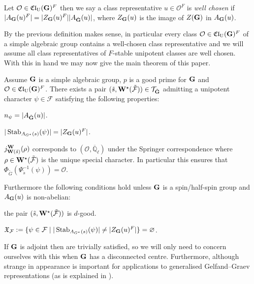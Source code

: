 \documentclass[eqthmnum]{jt-calcs}
\newcommand{\Clu}{\ensuremath{\mathfrak{Cl}_{\mathrm{U}}}}
\newcommand{\Ql}{\ensuremath{\overline{\mathbb{Q}}_{\ell}}}
\renewcommand{\cref}{\Cref}
\begin{document}
\begin{definition}
Let $\mathcal{O} \in \Clu(\bG)^F$ then we say a class representative $u \in \mathcal{O}^F$ is \emph{well chosen} if $|A_{\mathbf{G}}(u)^F| = |Z_{\mathbf{G}}(u)^F||A_{\tilde{\mathbf{G}}}(u)|$, where $Z_{\mathbf{G}}(u)$ is the image of $Z(\mathbf{G})$ in $A_{\mathbf{G}}(u)$.
\end{definition}

By \cite[Proposition 2.4]{taylor:2011:on-unipotent-supports} the previous definition makes sense, in particular every class $\mathcal{O} \in \Clu(\bG)^F$ of a simple algebraic group contains a well-chosen class representative and we will assume all class representatives of $F$-stable unipotent classes are well chosen. With this in hand we may now give the main theorem of this paper.

\begin{thm}\label{prop:A}
Assume $\mathbf{G}$ is a simple algebraic group, $p$ is a good prime for $\mathbf{G}$ and $\mathcal{O} \in \Clu(\bG)^F$. There exists a pair $(\tilde{s},\mathbf{W}^{\star}(\tilde{\mathcal{F}})) \in \mathcal{T}_{\tilde{\mathbf{G}}}$ admitting a unipotent character $\psi \in \mathcal{F}$ satisfying the following properties:
\begin{properties}
	\item $n_{\psi} = |A_{\tilde{\mathbf{G}}}(u)|$.\label{P1}
	\item $|\operatorname{Stab}_{A_{G^{\star}}(s)}(\psi)| = |Z_{\mathbf{G}}(u)^F|$.\label{P2}
	\item $j_{\mathbf{W}(\tilde{s})}^{\mathbf{W}}(\rho)$ corresponds to $(\mathcal{O},\Ql)$ under the Springer correspondence where $\rho \in \mathbf{W}^{\star}(\tilde{\mathcal{F}})$ is the unique special character. In particular this ensures that $\Phi_{\tilde{G}}(\Psi_{\tilde{s}}^{-1}(\psi)) = \mathcal{O}$.\label{P3}
\end{properties}
Furthermore the following conditions hold unless $\mathbf{G}$ is a spin/half-spin group and $A_{\mathbf{G}}(u)$ is non-abelian:
\begin{properties}[resume]
	\item the pair $(\tilde{s},\mathbf{W}^{\star}(\tilde{\mathcal{F}}))$ is $d$-good.\label{P4}
	\item $\mathfrak{X}_{\mathcal{F}} := \{\psi \in \mathcal{F} \mid |\operatorname{Stab}_{A_{G^{\star}}(s)}(\psi)| \neq |Z_{\mathbf{G}}(u)^F|\} = \varnothing$.\label{P5}
\end{properties}
\end{thm}

\begin{rem}
If $\mathbf{G}$ is adjoint then \cref{P2,P5} are trivially satisfied, so we will only need to concern ourselves with this when $\mathbf{G}$ has a disconnected centre. Furthermore, although strange in appearance \cref{P5} is important for applications to generalised Gelfand--Graev representations (as is explained in \cite{taylor:2011:on-unipotent-supports}).
\end{rem}
\end{document}
